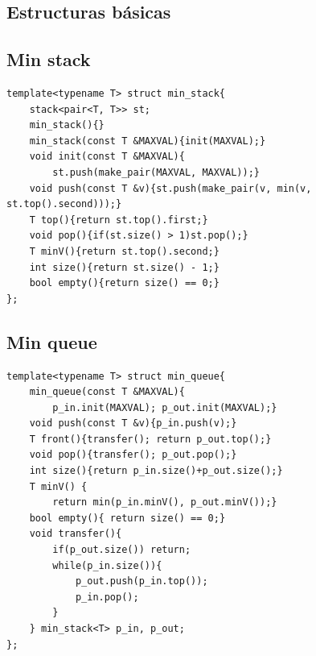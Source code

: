 \documentclass[12 pts,spanish,mexico]{article}
\numberwithin{equation}{section}
\begin{document}
\begin{multicols}{2}
\section{Estructuras básicas}
\subsection{Min stack}
\begin{verbatim}
template<typename T> struct min_stack{
    stack<pair<T, T>> st;
    min_stack(){}
    min_stack(const T &MAXVAL){init(MAXVAL);}
    void init(const T &MAXVAL){
        st.push(make_pair(MAXVAL, MAXVAL));}
    void push(const T &v){st.push(make_pair(v, min(v, st.top().second)));}
    T top(){return st.top().first;}
    void pop(){if(st.size() > 1)st.pop();}
    T minV(){return st.top().second;}
    int size(){return st.size() - 1;}
    bool empty(){return size() == 0;}
};
\end{verbatim}

\subsection{Min queue}
\begin{verbatim}
template<typename T> struct min_queue{
    min_queue(const T &MAXVAL){
        p_in.init(MAXVAL); p_out.init(MAXVAL);}
    void push(const T &v){p_in.push(v);}
    T front(){transfer(); return p_out.top();}
    void pop(){transfer(); p_out.pop();}
    int size(){return p_in.size()+p_out.size();}
    T minV() {
        return min(p_in.minV(), p_out.minV());}
    bool empty(){ return size() == 0;}
    void transfer(){
        if(p_out.size()) return;
        while(p_in.size()){
            p_out.push(p_in.top());
            p_in.pop();
        }
    } min_stack<T> p_in, p_out;
};
\end{verbatim}


\end{multicols}
\end{document}
